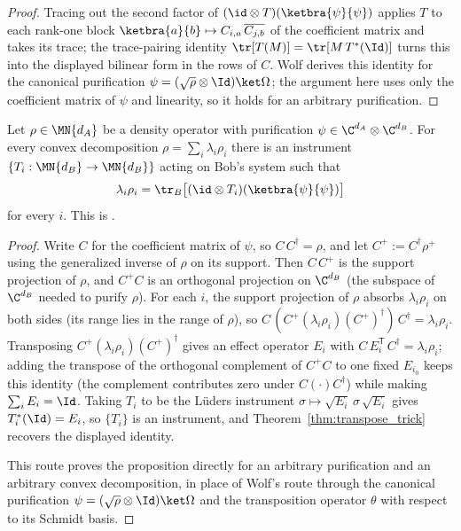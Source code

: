 \begin{proof}\leanok
    Tracing out the second factor of $(\id\otimes T)(\ketbra{\psi}{\psi})$
    applies $T$ to each rank-one block $\ketbra{a}{b}\mapsto C_{i,a}\,
    \overline{C_{j,b}}$ of the coefficient matrix and takes its trace; the
    trace-pairing identity $\tr[T(M)]=\tr[M\,T^*(\Id)]$ turns this into the
    displayed bilinear form in the rows of $C$. Wolf derives this identity
    for the canonical purification $\psi=(\sqrt\rho\otimes\Id)\ket\Omega$;
    the argument here uses only the coefficient matrix of $\psi$ and
    linearity, so it holds for an arbitrary purification.
\end{proof}

\begin{theorem}\label{thm:quantum_steering}
    \leanok
    Let $\rho\in\MN{d_A}$ be a density operator with purification
    $\psi\in\C^{d_A}\otimes\C^{d_B}$. For every convex decomposition
    $\rho=\sum_i\lambda_i\rho_i$ there is an instrument
    $\{T_i:\MN{d_B}\to\MN{d_B}\}$ acting on Bob's system such that
    \begin{align}
        \lambda_i\rho_i = \tr_B\bigl[(\id\otimes T_i)(\ketbra{\psi}{\psi})\bigr]
        \notag
    \end{align}
    for every $i$. This is \cite[Proposition~(Quantum steering)]{Wolf2012Quantum}.
\end{theorem}

\begin{proof}\leanok
    Write $C$ for the coefficient matrix of $\psi$, so $C\,C^\dagger=\rho$,
    and let $C^+:=C^\dagger\rho^+$ using the generalized inverse of $\rho$
    on its support. Then $C\,C^+$ is the support projection of $\rho$, and
    $C^+C$ is an orthogonal projection on $\C^{d_B}$ (the subspace of
    $\C^{d_B}$ needed to purify $\rho$). For each $i$, the support
    projection of $\rho$ absorbs $\lambda_i\rho_i$ on both sides (its range
    lies in the range of $\rho$), so
    $C\,(C^+(\lambda_i\rho_i)(C^+)^\dagger)\,C^\dagger=\lambda_i\rho_i$.
    Transposing $C^+(\lambda_i\rho_i)(C^+)^\dagger$ gives an effect operator
    $E_i$ with $C\,E_i^{\mathsf T}\,C^\dagger=\lambda_i\rho_i$; adding the
    transpose of the orthogonal complement of $C^+C$ to one fixed $E_{i_0}$
    keeps this identity (the complement contributes zero under $C(\cdot)C^\dagger$)
    while making $\sum_i E_i=\Id$. Taking $T_i$ to be the Lüders instrument
    $\sigma\mapsto\sqrt{E_i}\,\sigma\,\sqrt{E_i}$ gives
    $T_i^*(\Id)=E_i$, so $\{T_i\}$ is an instrument, and
    Theorem~\ref{thm:transpose_trick} recovers the displayed identity.

    This route proves the proposition directly for an arbitrary purification
    and an arbitrary convex decomposition, in place of Wolf's route through
    the canonical purification $\psi=(\sqrt\rho\otimes\Id)\ket\Omega$ and
    the transposition operator $\theta$ with respect to its Schmidt basis.
\end{proof}

